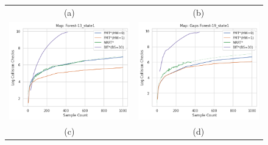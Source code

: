 \documentclass{article}
\begin{document}
\begin{figure}[H]
{\begin{tabular}{cc}
			(a) & (b)  \\[6pt]
			\includegraphics[scale=0.45]{scVcc_Forest-13_state1.png} & \includegraphics[scale=0.45]{scVcc_Gaps Forest-19_state1.png}    \\
			(c) & (d) \\[6pt]

\end{tabular}}
\end{figure}
\end{document}
